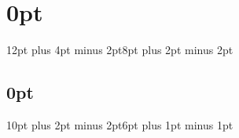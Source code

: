 \usepackage{setspace}

\usepackage{titlesec}
\titleformat{\section}{\normalfont\bfseries\Large}{\thesection}{1em}{}
\titlespacing\section{0pt}{12pt plus 4pt minus 2pt}{8pt plus 2pt minus 2pt}

\titleformat{\subsection}{\normalfont\bfseries\large}{\thesubsection}{1em}{}
\titlespacing\subsection{0pt}{10pt plus 2pt minus 2pt}{6pt plus 1pt minus 1pt}
